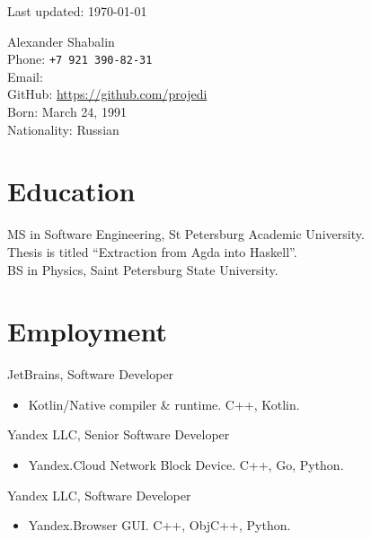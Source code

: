 \thispagestyle{empty}

\begin{flushright}
\scriptsize Last updated: \today
\end{flushright}

{\LARGE Alexander Shabalin}\\[1cm]
Phone: \texttt{+7 921 390-82-31}\\
Email: \\
GitHub: \url{https://github.com/projedi}\\[.1cm]
Born: March 24, 1991\\
Nationality: Russian

\section*{Education}

   MS in Software Engineering, St Petersburg Academic University.\\
   Thesis is titled ``Extraction from Agda into Haskell''.\\[.3cm]
   BS in Physics, Saint Petersburg State University.

\section*{Employment}

  JetBrains, Software Developer
  \begin{itemize}
    \itemsep 0cm
    \item Kotlin/Native compiler \& runtime.
          C++, Kotlin.
  \end{itemize}

  Yandex LLC, Senior Software Developer
  \begin{itemize}
    \itemsep 0cm
    \item Yandex.Cloud Network Block Device.
          C++, Go, Python.
  \end{itemize}

  Yandex LLC, Software Developer
  \begin{itemize}
    \itemsep 0cm
    \item Yandex.Browser GUI.
          C++, ObjC++, Python.
  \end{itemize}

